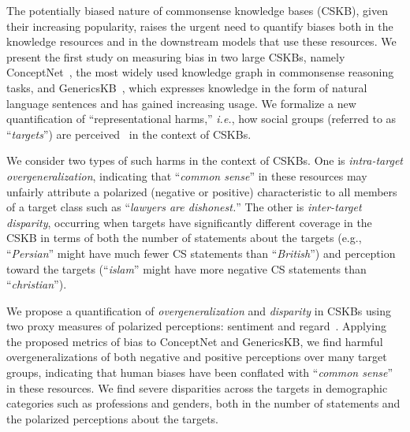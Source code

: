  
The potentially biased nature of commonsense knowledge bases (CSKB), %
given their increasing popularity, raises the urgent need to quantify biases both in the knowledge resources and in the downstream models that use these resources.
We present the first study on measuring bias in two large CSKBs, namely ConceptNet~\cite{speer2017conceptnet}, the most widely used knowledge graph in commonsense reasoning tasks, and GenericsKB~\cite{bhakthavatsalam2020genericskb}, which expresses knowledge in the form of natural language sentences and has gained increasing usage.
We formalize a new quantification of ``representational harms,'' \textit{i.e.}, how social groups (referred to as ``\emph{targets}'') are perceived~\cite{barocas2017problem,blodgett-etal-2020-language} in the context of CSKBs. 

We consider two types of such harms in the context of CSKBs. One is \emph{intra-target overgeneralization}, indicating that ``\emph{common sense}'' in these resources may unfairly attribute a polarized (negative or positive) characteristic to all members of a target class such as ``\emph{lawyers are dishonest.}'' The other is \emph{inter-target disparity}, occurring when targets have significantly different coverage in the CSKB in terms of both the number of statements about the targets (e.g., ``\emph{Persian}'' might have much fewer CS statements than ``\emph{British}'') and perception toward the targets (``\emph{islam}'' might have more negative CS statements than ``\emph{christian}'').


We propose a quantification of \emph{overgeneralization} and \emph{disparity} in CSKBs using two proxy measures of polarized perceptions: sentiment and regard~\cite{sheng2019woman}. %
Applying the proposed metrics of bias to ConceptNet and GenericsKB, we find harmful overgeneralizations of both negative and positive perceptions over many target groups, indicating that human biases have been conflated with ``\emph{common sense}'' in these resources. We find severe disparities across the targets in demographic categories such as professions and genders, both in the number of statements and the polarized perceptions about the targets.

